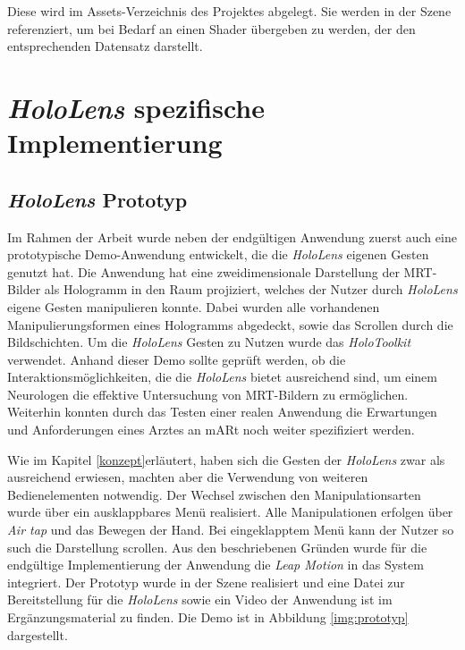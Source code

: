 Diese wird im Assets-Verzeichnis des Projektes abgelegt. Sie werden in der Szene referenziert, um bei Bedarf an einen Shader übergeben zu werden, der den entsprechenden Datensatz darstellt. 

\section{\textit{HoloLens} spezifische Implementierung}
\label{plattformen}

\subsection{\textit{HoloLens} Prototyp}
Im Rahmen der Arbeit wurde neben der endgültigen Anwendung zuerst auch eine prototypische Demo-Anwendung entwickelt, die die \textit{HoloLens} eigenen Gesten genutzt hat. Die Anwendung hat eine zweidimensionale Darstellung der MRT-Bilder als Hologramm in den Raum projiziert, welches der Nutzer durch \textit{HoloLens} eigene Gesten manipulieren konnte. Dabei wurden alle vorhandenen Manipulierungsformen eines Hologramms abgedeckt, sowie das Scrollen durch die Bildschichten. Um die \textit{HoloLens} Gesten zu Nutzen wurde das \textit{HoloToolkit} verwendet. 
Anhand dieser Demo sollte geprüft werden, ob die Interaktionsmöglichkeiten, die die \textit{HoloLens} bietet ausreichend sind, um einem Neurologen die effektive Untersuchung von MRT-Bildern zu ermöglichen.
Weiterhin konnten durch das Testen einer realen Anwendung die Erwartungen und Anforderungen eines Arztes an mARt noch weiter spezifiziert werden.  

Wie im Kapitel \ref{konzept}erläutert, haben sich die Gesten der \textit{HoloLens} zwar als ausreichend erwiesen, machten aber die Verwendung von weiteren Bedienelementen notwendig. Der Wechsel zwischen den Manipulationsarten wurde über ein ausklappbares Menü realisiert. Alle Manipulationen erfolgen über \textit{Air tap} und das Bewegen der Hand. Bei eingeklapptem Menü kann der Nutzer so such die Darstellung scrollen. Aus den beschriebenen Gründen wurde für die endgültige Implementierung der Anwendung die \textit{Leap Motion} in das System integriert.
Der Prototyp wurde in der Szene  realisiert und eine Datei zur Bereitstellung für die \textit{HoloLens} sowie ein Video der Anwendung ist im Ergänzungsmaterial zu finden.
Die Demo ist in Abbildung \ref{img:prototyp} dargestellt.

